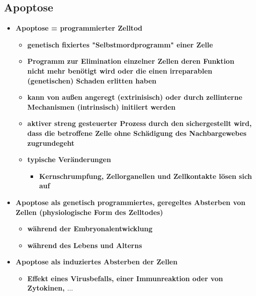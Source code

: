 \subsection{Apoptose}
	\begin{itemize}
		\item \textbf{Apoptose = programmierter Zelltod}
			\begin{itemize}
				\item \textbf{genetisch fixiertes "Selbstmordprogramm" einer Zelle}
				\item \textbf{Programm zur Elimination einzelner Zellen deren Funktion nicht mehr benötigt wird oder die einen irreparablen (genetischen) Schaden erlitten haben}
				\item \textbf{kann von außen angeregt (extrinisisch) oder durch  zellinterne Mechanismen (intrinsisch) initiiert werden}
				\item \textbf{aktiver streng gesteuerter Prozess durch den sichergestellt wird, dass die betroffene Zelle ohne Schädigung des Nachbargewebes zugrundegeht}
				\item \textbf{typische Veränderungen}
					\begin{itemize}
						\item \textbf{Kernschrumpfung, Zellorganellen und Zellkontakte lösen sich auf}
					\end{itemize}
			\end{itemize}
		\item \textbf{Apoptose als genetisch programmiertes, geregeltes Absterben von Zellen (physiologische Form des Zelltodes)}
			\begin{itemize}
				\item \textbf{während der Embryonalentwicklung}
				\item \textbf{während des Lebens und Alterns}
			\end{itemize}
		\item \textbf{Apoptose als induziertes Absterben der Zellen}
			\begin{itemize}
				\item \textbf{Effekt eines Virusbefalls, einer Immunreaktion oder von Zytokinen, $\dots$}
			\end{itemize}
	\end{itemize}


